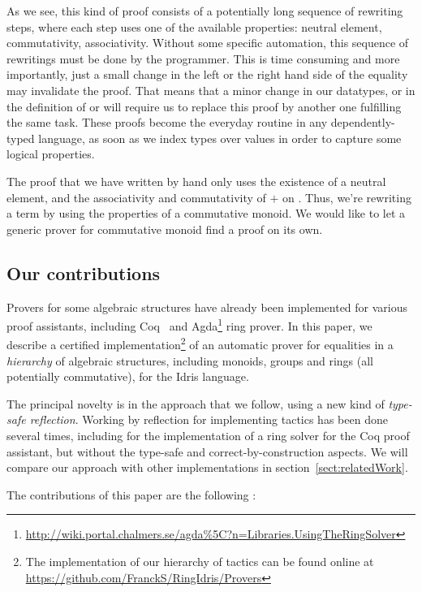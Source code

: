 As we see, this kind of proof consists of a potentially long sequence of rewriting steps, where each step uses one of the available properties: neutral element, commutativity, associativity. Without some specific automation, this sequence of rewritings must be done by the programmer.
This is time consuming and more importantly, just a small change in the left or the right hand side of the equality may invalidate the proof. That means that a minor change in our datatypes, or in the definition of  or  will require us to replace this proof by another one fulfilling the same task.
These proofs become the everyday routine in any dependently-typed language, as soon as we index types over values in order to capture some logical properties.  

The proof that we have written by hand only uses the existence of a neutral element, and the associativity and commutativity of $+$ on . Thus, we're rewriting a term by using the properties of a commutative monoid. We would like to let a generic prover for commutative monoid find a proof on its own.

\subsection{Our contributions}

Provers for some algebraic structures have already been implemented for various proof assistants, including Coq~\cite{Coq2005} and Agda\footnote{\url{http://wiki.portal.chalmers.se/agda\%5C?n=Libraries.UsingTheRingSolver}} ring prover. In this paper, we describe a certified
implementation\footnote{The implementation of our hierarchy of tactics can be found online at \url{https://github.com/FranckS/RingIdris/Provers}} of an automatic prover for equalities in a \emph{hierarchy} of algebraic
structures, including monoids, groups and rings (all potentially commutative),
for the Idris language. 

The principal novelty is in the approach that we follow, using a
new kind of \emph{type-safe reflection}.  Working by reflection for implementing tactics has been done several times, including for the implementation of a ring solver for the Coq proof assistant, but without the type-safe and correct-by-construction aspects. We will
compare our approach with other implementations in section~\ref{sect:relatedWork}.

The contributions of this paper are the following :

